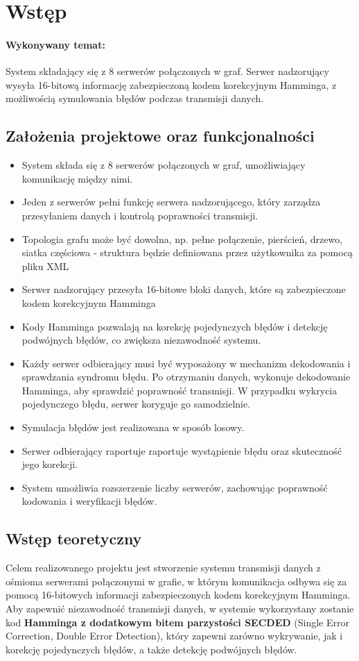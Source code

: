 \section{Wstęp}
\paragraph{Wykonywany temat:} System składający się z 8 serwerów połączonych w graf. Serwer nadzorujący wysyła 16-bitową informację zabezpieczoną kodem korekcyjnym Hamminga, z możliwością symulowania błędów podczas transmisji danych.

\subsection{Założenia projektowe oraz funkcjonalności}
\begin{itemize}
	\item System składa się z 8 serwerów połączonych w graf, umożliwiający komunikację między nimi.
	\item Jeden z serwerów pełni funkcję serwera nadzorującego, który zarządza przesyłaniem danych i kontrolą poprawności transmisji.
	\item Topologia grafu może być dowolna, np. pełne połączenie, pierścień, drzewo, siatka częściowa - struktura będzie definiowana przez użytkownika za pomocą pliku XML
	\item Serwer nadzorujący przesyła 16-bitowe bloki danych, które są zabezpieczone kodem korekcyjnym Hamminga 
	\item Kody Hamminga pozwalają na korekcję pojedynczych błędów i detekcję podwójnych błędów, co zwiększa niezawodność systemu.
	\item Każdy serwer odbierający musi być wyposażony w mechanizm dekodowania i sprawdzania syndromu błędu. Po otrzymaniu danych, wykonuje dekodowanie Hamminga, aby sprawdzić poprawność transmisji. W przypadku wykrycia pojedynczego błędu, serwer koryguje go samodzielnie.
	\item Symulacja błędów jest realizowana w sposób losowy.
	\item Serwer odbierający raportuje raportuje wystąpienie błędu oraz skuteczność jego korekcji.
	\item System umożliwia rozszerzenie liczby serwerów, zachowując poprawność kodowania i weryfikacji błędów.
\end{itemize}

\subsection{Wstęp teoretyczny}
Celem realizowanego projektu jest stworzenie systemu transmisji danych z ośmioma serwerami połączonymi w grafie, w którym komunikacja odbywa się za pomocą 16-bitowych informacji zabezpieczonych kodem korekcyjnym Hamminga. Aby zapewnić niezawodność transmisji danych, w systemie wykorzystany zostanie kod \textbf{Hamminga z dodatkowym bitem parzystości SECDED} (Single Error Correction, Double Error Detection), który zapewni zarówno wykrywanie, jak i korekcję pojedynczych błędów, a także detekcję podwójnych błędów. 

